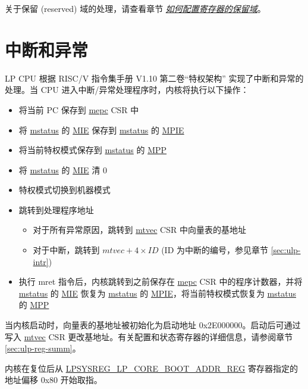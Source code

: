 \documentclass[main\_\_CN.tex]{subfiles}
\begin{document}
关于保留 (reserved) 域的处理，请查看章节 \hyperref[programming-reserved-field]{\textit{如何配置寄存器的保留域}}。




\section{中断和异常}

LP CPU 根据 RISC\-/V 指令集手册 V1.10 第二卷“特权架构” 实现了中断和异常的处理。当 CPU 进入中断/异常处理程序时，内核将执行以下操作：
\begin{itemize}
    \item 将当前 PC 保存到 \hyperref[regdesc:LPMEPC]{mepc} CSR 中
    \item 将 \hyperref[regdesc:LPMSTATUS]{mstatus} 的 \hyperref[fielddesc:LPMSTATUSMIE]{MIE} 保存到 \hyperref[regdesc:LPMSTATUS]{mstatus} 的 \hyperref[fielddesc:LPMSTATUSMPIE]{MPIE}
    \item 将当前特权模式保存到 \hyperref[regdesc:LPMSTATUS]{mstatus} 的 \hyperref[fielddesc:LPMSTATUSMPP]{MPP}
    \item 将 \hyperref[regdesc:LPMSTATUS]{mstatus} 的 \hyperref[fielddesc:LPMSTATUSMIE]{MIE}  清 0
    \item 特权模式切换到机器模式
    \item 跳转到处理程序地址
        \begin{itemize}
            \item 对于所有异常原因，跳转到 \hyperref[regdesc:LPMTVEC]{mtvec} CSR 中向量表的基地址
            \item 对于中断，跳转到 $\hyperref[regdesc:LPMTVEC]{mtvec} + 4 \times ID$ (ID 为中断的编号，参见章节 \ref{sec:ulp-intr})
        \end{itemize}
    \item 执行 mret 指令后，内核跳转到之前保存在 \hyperref[regdesc:LPMEPC]{mepc} CSR 中的程序计数器，并将 \hyperref[regdesc:LPMSTATUS]{mstatus} 的 \hyperref[fielddesc:LPMSTATUSMIE]{MIE} 恢复为 \hyperref[regdesc:LPMSTATUS]{mstatus} 的 \hyperref[fielddesc:LPMSTATUSMPIE]{MPIE}，将当前特权模式恢复为 \hyperref[regdesc:LPMSTATUS]{mstatus} 的 \hyperref[fielddesc:LPMSTATUSMPP]{MPP}
\end{itemize}

当内核启动时，向量表的基地址被初始化为启动地址 0x2E000000。启动后可通过写入 \hyperref[regdesc:LPMTVEC]{mtvec} CSR 更改基地址。有关配置和状态寄存器的详细信息，请参阅章节 \ref{sec:ulp-reg-summ}。

内核在复位后从 \hyperref[regdesc:LPSYSREGLPCOREBOOTADDRREG]{LPSYSREG\_LP\_CORE\_BOOT\_ADDR\_REG} 寄存器指定的地址偏移 0x80 开始取指。
\end{document}
